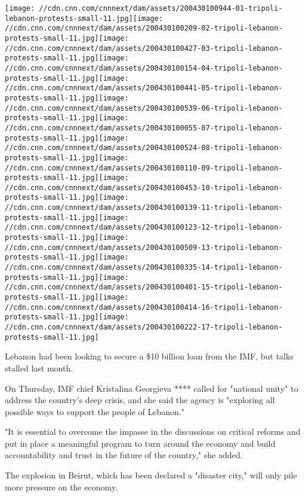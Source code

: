 \texttt{[image: //cdn.cnn.com/cnnnext/dam/assets/200430100944-01-tripoli-lebanon-protests-small-11.jpg]}\texttt{[image: //cdn.cnn.com/cnnnext/dam/assets/200430100209-02-tripoli-lebanon-protests-small-11.jpg]}\texttt{[image: //cdn.cnn.com/cnnnext/dam/assets/200430100427-03-tripoli-lebanon-protests-small-11.jpg]}\texttt{[image: //cdn.cnn.com/cnnnext/dam/assets/200430100154-04-tripoli-lebanon-protests-small-11.jpg]}\texttt{[image: //cdn.cnn.com/cnnnext/dam/assets/200430100441-05-tripoli-lebanon-protests-small-11.jpg]}\texttt{[image: //cdn.cnn.com/cnnnext/dam/assets/200430100539-06-tripoli-lebanon-protests-small-11.jpg]}\texttt{[image: //cdn.cnn.com/cnnnext/dam/assets/200430100055-07-tripoli-lebanon-protests-small-11.jpg]}\texttt{[image: //cdn.cnn.com/cnnnext/dam/assets/200430100524-08-tripoli-lebanon-protests-small-11.jpg]}\texttt{[image: //cdn.cnn.com/cnnnext/dam/assets/200430100110-09-tripoli-lebanon-protests-small-11.jpg]}\texttt{[image: //cdn.cnn.com/cnnnext/dam/assets/200430100453-10-tripoli-lebanon-protests-small-11.jpg]}\texttt{[image: //cdn.cnn.com/cnnnext/dam/assets/200430100139-11-tripoli-lebanon-protests-small-11.jpg]}\texttt{[image: //cdn.cnn.com/cnnnext/dam/assets/200430100123-12-tripoli-lebanon-protests-small-11.jpg]}\texttt{[image: //cdn.cnn.com/cnnnext/dam/assets/200430100509-13-tripoli-lebanon-protests-small-11.jpg]}\texttt{[image: //cdn.cnn.com/cnnnext/dam/assets/200430100335-14-tripoli-lebanon-protests-small-11.jpg]}\texttt{[image: //cdn.cnn.com/cnnnext/dam/assets/200430100401-15-tripoli-lebanon-protests-small-11.jpg]}\texttt{[image: //cdn.cnn.com/cnnnext/dam/assets/200430100414-16-tripoli-lebanon-protests-small-11.jpg]}\texttt{[image: //cdn.cnn.com/cnnnext/dam/assets/200430100222-17-tripoli-lebanon-protests-small-11.jpg]}

Lebanon had been looking to secure a \$10 billion loan from the IMF, but
talks stalled last month.

On Thursday, IMF chief Kristalina Georgieva **** called for "national
unity" to address the country's deep crisis, and she said the agency is
"exploring all possible ways to support the people of Lebanon."

"It is essential to overcome the impasse in the discussions on critical
reforms and put in place a meaningful program to turn around the economy
and build accountability and trust in the future of the country," she
added.

The explosion in Beirut, which has been declared a "disaster city," will
only pile more pressure on the economy.

